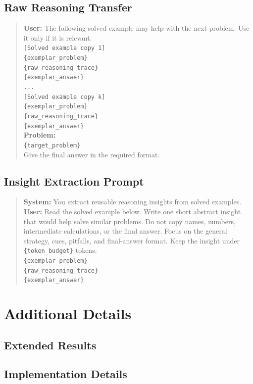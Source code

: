 \subsection{Raw Reasoning Transfer}

\begin{quote}
\textbf{User:} The following solved example may help with the next problem. Use it only if it is relevant.\\
\texttt{[Solved example copy 1]}\\
\texttt{\{exemplar\_problem\}}\\
\texttt{\{raw\_reasoning\_trace\}}\\
\texttt{\{exemplar\_answer\}}\\
\texttt{...}\\
\texttt{[Solved example copy k]}\\
\texttt{\{exemplar\_problem\}}\\
\texttt{\{raw\_reasoning\_trace\}}\\
\texttt{\{exemplar\_answer\}}\\
\textbf{Problem:}\\
\texttt{\{target\_problem\}}\\
Give the final answer in the required format.
\end{quote}

\subsection{Insight Extraction Prompt}

\begin{quote}
\textbf{System:} You extract reusable reasoning insights from solved examples.\\
\textbf{User:} Read the solved example below. Write one short abstract insight that would help solve similar problems. Do not copy names, numbers, intermediate calculations, or the final answer. Focus on the general strategy, cues, pitfalls, and final-answer format. Keep the insight under \texttt{\{token\_budget\}} tokens.\\
\texttt{\{exemplar\_problem\}}\\
\texttt{\{raw\_reasoning\_trace\}}\\
\texttt{\{exemplar\_answer\}}
\end{quote}


\section{Additional Details}

\subsection{Extended Results}

\subsection{Implementation Details}
